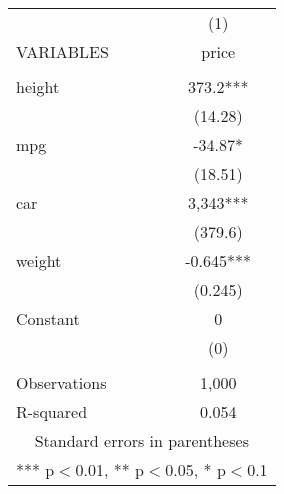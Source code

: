 \documentclass[]{article}
\begin{document}
\begin{tabular}{lc} \hline
 & (1) \\
VARIABLES & price \\ \hline
 &  \\
height & 373.2*** \\
 & (14.28) \\
mpg & -34.87* \\
 & (18.51) \\
car & 3,343*** \\
 & (379.6) \\
weight & -0.645*** \\
 & (0.245) \\
Constant & 0 \\
 & (0) \\
 &  \\
Observations & 1,000 \\
 R-squared & 0.054 \\ \hline
\multicolumn{2}{c}{ Standard errors in parentheses} \\
\multicolumn{2}{c}{ *** p$<$0.01, ** p$<$0.05, * p$<$0.1} \\
\end{tabular}
\end{document}
